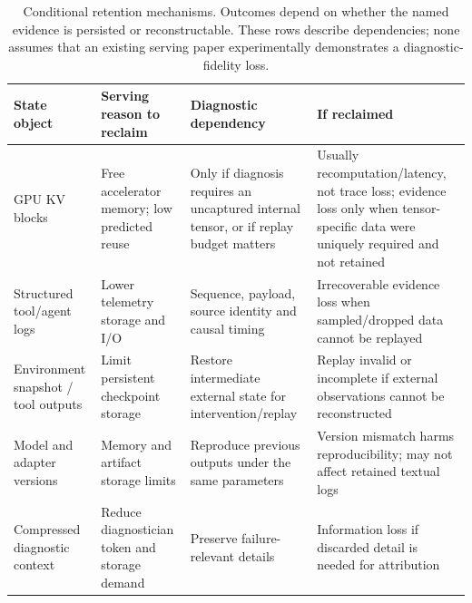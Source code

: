 \begin{table}[t]
\centering
\caption{Conditional retention mechanisms. Outcomes depend on whether the named evidence is persisted or reconstructable. These rows describe dependencies; none assumes that an existing serving paper experimentally demonstrates a diagnostic-fidelity loss.}
\label{tab:tension}
\footnotesize
\begin{tabularx}{\textwidth}{@{}p{}p{}p{}X@{}}
\toprule
\textbf{State object} & \textbf{Serving reason to reclaim} & \textbf{Diagnostic dependency} & \textbf{If reclaimed} \\
\midrule
GPU KV blocks & Free accelerator memory; low predicted reuse & Only if diagnosis requires an uncaptured internal tensor, or if replay budget matters & Usually recomputation/latency, not trace loss; evidence loss only when tensor-specific data were uniquely required and not retained \\
Structured tool/agent logs & Lower telemetry storage and I/O & Sequence, payload, source identity and causal timing & Irrecoverable evidence loss when sampled/dropped data cannot be replayed \\
Environment snapshot / tool outputs & Limit persistent checkpoint storage & Restore intermediate external state for intervention/replay & Replay invalid or incomplete if external observations cannot be reconstructed \\
Model and adapter versions & Memory and artifact storage limits & Reproduce previous outputs under the same parameters & Version mismatch harms reproducibility; may not affect retained textual logs \\
Compressed diagnostic context & Reduce diagnostician token and storage demand & Preserve failure-relevant details & Information loss if discarded detail is needed for attribution \\
\bottomrule
\end{tabularx}
\end{table}



